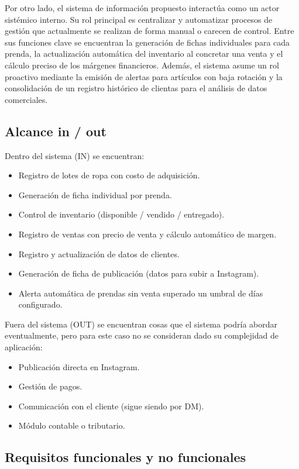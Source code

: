 \documentclass[11pt,letterpaper]{article}
\begin{document}
Por otro lado, el sistema de información propuesto interactúa como un actor sistémico interno. Su rol principal es centralizar y automatizar procesos de gestión que actualmente se realizan de forma manual o carecen de control. Entre sus funciones clave se encuentran la generación de fichas individuales para cada prenda, la actualización automática del inventario al concretar una venta y el cálculo preciso de los márgenes financieros. Además, el sistema asume un rol proactivo mediante la emisión de alertas para artículos con baja rotación y la consolidación de un registro histórico de clientas para el análisis de datos comerciales.

\subsection*{Alcance in / out}
Dentro del sistema (IN) se encuentran:
\begin{itemize}
    \item Registro de lotes de ropa con costo de adquisición.
    \item Generación de ficha individual por prenda.
    \item Control de inventario (disponible / vendido / entregado).
    \item Registro de ventas con precio de venta y cálculo automático de margen.
    \item Registro y actualización de datos de clientes.
    \item Generación de ficha de publicación (datos para subir a Instagram).
    \item Alerta automática de prendas sin venta superado un umbral de días configurado.
\end{itemize}

Fuera del sistema (OUT) se encuentran cosas que el sistema podría abordar eventualmente, pero para este caso no se consideran dado su complejidad de aplicación:
\begin{itemize}
    \item Publicación directa en Instagram.
    \item Gestión de pagos.
    \item Comunicación con el cliente (sigue siendo por DM).
    \item Módulo contable o tributario.
\end{itemize}

\newpage
\subsection*{Requisitos funcionales y no funcionales}
\end{document}
